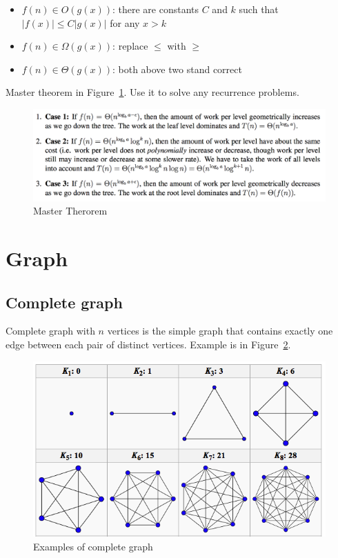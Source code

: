 \documentclass[11pt, oneside]{article}   	%
\begin{document}
\begin{itemize}
\item $f(n) \in O(g(x))$: there are constants $C$ and $k$ such that $|f(x)| \leq C|g(x)|$ for any $x > k$
\item $f(n) \in \Omega(g(x))$: replace $\leq$ with $\geq$
\item $f(n) \in \Theta(g(x))$: both above two stand correct
\end{itemize}

Master theorem in Figure~\ref{fig:mt}. Use it to solve any recurrence problems.

\begin{figure}[htpb]
\begin{center}
\includegraphics[width=\textwidth]{master.png}
\caption{Master Therorem}
\label{fig:mt}
\end{center}
\end{figure}


\section{Graph}

\subsection{Complete graph}
Complete graph with $n$ vertices is the simple graph that contains exactly one edge between each pair of distinct vertices. Example is in Figure~\ref{fig:complete_graph}.

\begin{figure}[htpb]
\begin{center}
\includegraphics[width=\textwidth]{complete_graph.png}
\caption{Examples of complete graph}
\label{fig:complete_graph}
\end{center}
\end{figure}
\end{document}
